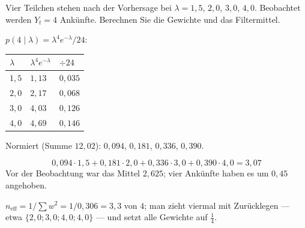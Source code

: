 \begin{aufgabe}
Vier Teilchen stehen nach der Vorhersage bei $\lambda = 1{,}5$, $2{,}0$, $3{,}0$, $4{,}0$. Beobachtet werden $Y_t = 4$ Ankünfte. Berechnen Sie die Gewichte und das Filtermittel.

\loesung
{}
$p(4\mid\lambda) = \lambda^4 e^{-\lambda}/24$:
\begin{center}
{\small
\renewcommand{\arraystretch}{1.48}
\begin{tabular}{@{}P{1.4cm}P{2.0cm}P{2.0cm}@{}}
\toprule
$\lambda$ & $\lambda^4 e^{-\lambda}$ & $\div 24$\\
\midrule
$1{,}5$ & $1{,}13$ & $0{,}035$\\
$2{,}0$ & $2{,}17$ & $0{,}068$\\
$3{,}0$ & $4{,}03$ & $0{,}126$\\
$4{,}0$ & $4{,}69$ & $0{,}146$\\
\bottomrule
\end{tabular}}
\end{center}
Normiert (Summe $12{,}02$): $0{,}094$, $0{,}181$, $0{,}336$, $0{,}390$.

\[ 0{,}094\cdot1{,}5 + 0{,}181\cdot2{,}0 + 0{,}336\cdot3{,}0 + 0{,}390\cdot4{,}0 = 3{,}07 \]
Vor der Beobachtung war das Mittel $2{,}625$; vier Ankünfte haben es um $0{,}45$ angehoben.

$n_{\text{eff}} = 1/\sum w^2 = 1/0{,}306 = 3{,}3$ von $4$; man zieht viermal mit Zurücklegen --- etwa $\{2{,}0; 3{,}0; 4{,}0; 4{,}0\}$ --- und setzt alle Gewichte auf $\tfrac14$.

\begin{center}
\begin{minipage}{0.88\textwidth}
\end{minipage}
\end{center}
\end{aufgabe}

